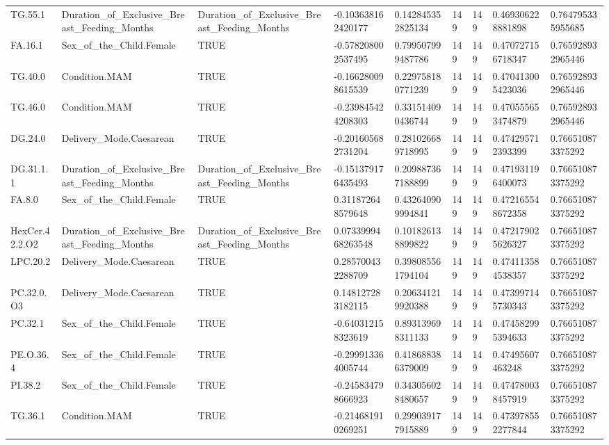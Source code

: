 \begin{longtable}{lllllllll}
TG.55.1 & Duration\_of\_Exclusive\_Breast\_Feeding\_Months & Duration\_of\_Exclusive\_Breast\_Feeding\_Months & -0.103638162420177 & 0.142845352825134 & 149 & 149 & 0.469306228881898 & 0.764795335955685 \\
FA.16.1 & Sex\_of\_the\_Child.Female & TRUE & -0.578208002537495 & 0.799507999487786 & 149 & 149 & 0.470727156718347 & 0.765928932965446 \\
TG.40.0 & Condition.MAM & TRUE & -0.166280098615539 & 0.229758180771239 & 149 & 149 & 0.470413005423036 & 0.765928932965446 \\
TG.46.0 & Condition.MAM & TRUE & -0.239845424208303 & 0.331514090436744 & 149 & 149 & 0.470555653474879 & 0.765928932965446 \\
DG.24.0 & Delivery\_Mode.Caesarean & TRUE & -0.201605682731204 & 0.281026689718995 & 149 & 149 & 0.474295712393399 & 0.766510873375292 \\
DG.31.1.1 & Duration\_of\_Exclusive\_Breast\_Feeding\_Months & Duration\_of\_Exclusive\_Breast\_Feeding\_Months & -0.151379176435493 & 0.209887367188899 & 149 & 149 & 0.471931196400073 & 0.766510873375292 \\
FA.8.0 & Sex\_of\_the\_Child.Female & TRUE & 0.311872648579648 & 0.432640909994841 & 149 & 149 & 0.472165548672358 & 0.766510873375292 \\
HexCer.42.2.O2 & Duration\_of\_Exclusive\_Breast\_Feeding\_Months & Duration\_of\_Exclusive\_Breast\_Feeding\_Months & 0.0733999468263548 & 0.101826138899822 & 149 & 149 & 0.472179025626327 & 0.766510873375292 \\
LPC.20.2 & Delivery\_Mode.Caesarean & TRUE & 0.285700432288709 & 0.398085561794104 & 149 & 149 & 0.474113584538357 & 0.766510873375292 \\
PC.32.0.O3 & Delivery\_Mode.Caesarean & TRUE & 0.148127283182115 & 0.206341219920388 & 149 & 149 & 0.473997145730343 & 0.766510873375292 \\
PC.32.1 & Sex\_of\_the\_Child.Female & TRUE & -0.640312158323619 & 0.893139698311133 & 149 & 149 & 0.474582995394633 & 0.766510873375292 \\
PE.O.36.4 & Sex\_of\_the\_Child.Female & TRUE & -0.299913364005744 & 0.418688386379009 & 149 & 149 & 0.47495607463248 & 0.766510873375292 \\
PI.38.2 & Sex\_of\_the\_Child.Female & TRUE & -0.245834798666923 & 0.343056028480657 & 149 & 149 & 0.474780038457919 & 0.766510873375292 \\
TG.36.1 & Condition.MAM & TRUE & -0.214681910269251 & 0.299039177915889 & 149 & 149 & 0.473978552277844 & 0.766510873375292 \\

\end{longtable}
